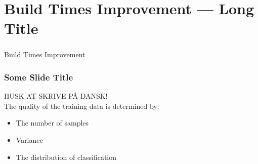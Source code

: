 \section[Build Times Improvement]{Build Times Improvement --- Long Title}

\begin{frame}
  \frametitle{}
  \begin{center}
    {\Huge Build Times Improvement}
  \end{center}
\end{frame}

\begin{frame}
    \frametitle{Some Slide Title}
    HUSK AT SKRIVE PÅ DANSK!\\
    The quality of the training data is determined by:
    \begin{itemize}
        \item The number of samples
        \item Variance
        \item The distribution of classification
    \end{itemize}
\end{frame}
